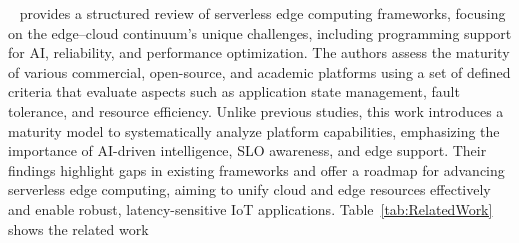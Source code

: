 ~\cite{raith2023serverless} provides a structured review of serverless edge computing frameworks, focusing on the edge–cloud continuum's unique challenges, including programming support for AI, reliability, and performance optimization. The authors assess the maturity of various commercial, open-source, and academic platforms using a set of defined criteria that evaluate aspects such as application state management, fault tolerance, and resource efficiency. Unlike previous studies, this work introduces a maturity model to systematically analyze platform capabilities, emphasizing the importance of AI-driven intelligence, SLO awareness, and edge support. Their findings highlight gaps in existing frameworks and offer a roadmap for advancing serverless edge computing, aiming to unify cloud and edge resources effectively and enable robust, latency-sensitive IoT applications.
Table~\ref{tab:RelatedWork} shows the related work
